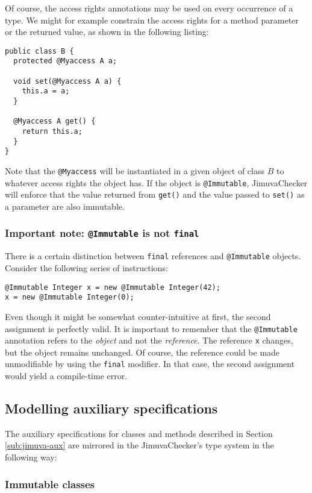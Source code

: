 \documentclass{pracamgr}
\theoremstyle{break}
\theoremstyle{break}
\theoremstyle{break}
\begin{document}
Of course, the access rights annotations may be used on every
occurrence of a type. We might for example constrain the access rights
for a method parameter or the returned value, as shown in the
following listing:
\begin{lstlisting}
public class B {
  protected @Myaccess A a;

  void set(@Myaccess A a) {
    this.a = a;
  }

  @Myaccess A get() {
    return this.a;
  }
}
\end{lstlisting}
Note that the \texttt{@Myaccess} will be instantiated in a given
object of class $B$ to whatever access rights the object has. If the
object is \texttt{@Immutable}, JimuvaChecker will enforce that the
value returned from \texttt{get()} and the value passed to
\texttt{set()} as a parameter are also immutable.

\subsubsection{Important note: \texttt{@Immutable} is not \texttt{final}}

There is a certain distinction between \texttt{final} references and
\texttt{@Immutable} objects. Consider the following series of
instructions:
\begin{lstlisting}
@Immutable Integer x = new @Immutable Integer(42);
x = new @Immutable Integer(0);
\end{lstlisting}
Even though it might be somewhat counter-intuitive at first, the
second assignment is perfectly valid. It is important to remember that
the \texttt{@Immutable} annotation refers to the \emph{object} and not
the \emph{reference}. The reference \texttt{x} changes, but the object
remains unchanged. Of course, the reference could be made unmodifiable
by using the \texttt{final} modifier. In that case, the second
assignment would yield a compile-time error.

\subsection{Modelling auxiliary specifications}

The auxiliary specifications for classes and methods described in
Section \ref{sub:jimuva-aux} are mirrored in the JimuvaChecker's type
system in the following way: 

\subsubsection{Immutable classes}
\end{document}
